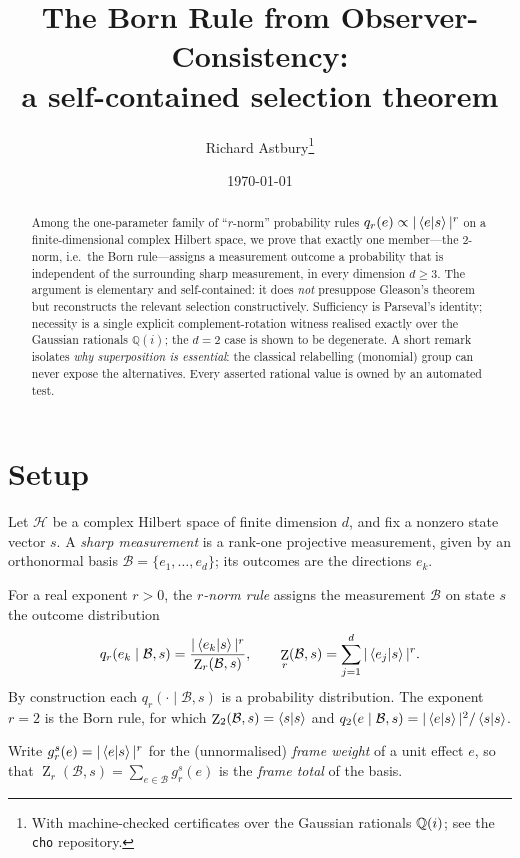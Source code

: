 \documentclass[11pt,a4paper]{article}
\title{The Born Rule from Observer-Consistency:\\
a self-contained selection theorem}
\author{Richard Astbury\thanks{With machine-checked certificates over the Gaussian
rationals $\Q(i)$; see the \texttt{cho} repository.}}
\date{\today}
\theoremstyle{definition}
\theoremstyle{remark}
\newcommand{\Q}{\mathbb{Q}}
\newcommand{\Hil}{\mathcal{H}}
\newcommand{\basis}{\mathcal{B}}
\DeclareMathOperator{\Zframe}{Z}
\begin{document}
\maketitle

\begin{abstract}
Among the one-parameter family of ``$r$-norm'' probability rules
$q_r(e)\propto|\braket{e|s}|^{r}$ on a finite-dimensional complex Hilbert space, we prove
that exactly one member---the $2$-norm, i.e.\ the Born rule---assigns a measurement outcome
a probability that is independent of the surrounding sharp measurement, in every dimension
$d\ge 3$. The argument is elementary and self-contained: it does \emph{not} presuppose
Gleason's theorem but reconstructs the relevant selection constructively. Sufficiency is
Parseval's identity; necessity is a single explicit complement-rotation witness realised
exactly over the Gaussian rationals $\Q(i)$; the $d=2$ case is shown to be degenerate. A
short remark isolates \emph{why superposition is essential}: the classical relabelling
(monomial) group can never expose the alternatives. Every asserted rational value is owned
by an automated test.
\end{abstract}

\section{Setup}

Let $\Hil$ be a complex Hilbert space of finite dimension $d$, and fix a nonzero state
vector $s$. A \emph{sharp measurement} is a rank-one projective measurement, given by an
orthonormal basis $\basis=\{e_1,\dots,e_d\}$; its outcomes are the directions $e_k$.

For a real exponent $r>0$, the \emph{$r$-norm rule} assigns the measurement $\basis$ on
state $s$ the outcome distribution
\begin{equation}
q_r(e_k\mid\basis,s)=\frac{|\braket{e_k|s}|^{r}}{\Zframe_r(\basis,s)},
\qquad
\Zframe_r(\basis,s)=\sum_{j=1}^{d}|\braket{e_j|s}|^{r}.
\label{eq:rnorm}
\end{equation}
By construction each $q_r(\cdot\mid\basis,s)$ is a probability distribution. The exponent
$r=2$ is the Born rule, for which $\Zframe_2(\basis,s)=\braket{s|s}$ and
$q_2(e\mid\basis,s)=|\braket{e|s}|^{2}/\braket{s|s}$.

Write $g_r^{s}(e)=|\braket{e|s}|^{r}$ for the (unnormalised) \emph{frame weight} of a unit
effect $e$, so that $\Zframe_r(\basis,s)=\sum_{e\in\basis}g_r^{s}(e)$ is the \emph{frame
total} of the basis.
\end{document}
